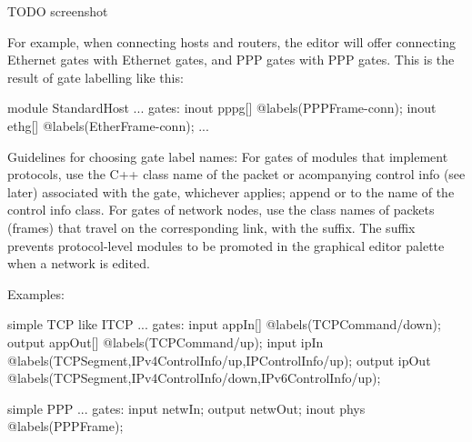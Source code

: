 \ifdraft TODO
screenshot
\fi

For example, when connecting hosts and routers, the editor will offer connecting
Ethernet gates with Ethernet gates, and PPP gates with PPP gates. This is the
result of gate labelling like this:

\begin{ned}
module StandardHost
{
    ...
    gates:
        inout pppg[] @labels(PPPFrame-conn);
        inout ethg[] @labels(EtherFrame-conn);
    ...
}
\end{ned}

Guidelines for choosing gate label names: For gates of modules that
implement protocols, use the C++ class name of the packet or acompanying
control info (see later) associated with the gate, whichever applies;
append  or  to the name of the control info class. For
gates of network nodes, use the class names of packets (frames) that travel
on the corresponding link, with the  suffix. The suffix prevents
protocol-level modules to be promoted in the graphical editor palette when
a network is edited.

Examples:

\begin{ned}
simple TCP like ITCP
{
    ...
    gates:
        input appIn[] @labels(TCPCommand/down);
        output appOut[] @labels(TCPCommand/up);
        input ipIn @labels(TCPSegment,IPv4ControlInfo/up,IPControlInfo/up);
        output ipOut @labels(TCPSegment,IPv4ControlInfo/down,IPv6ControlInfo/up);
}
\end{ned}


\begin{ned}
simple PPP
{
    ...
    gates:
        input netwIn;
        output netwOut;
        inout phys @labels(PPPFrame);
}
\end{ned}


